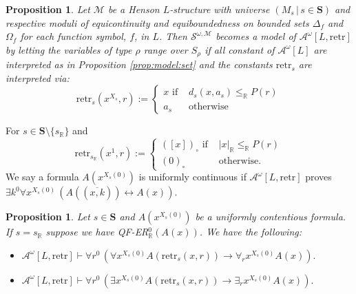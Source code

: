 \documentclass[11pt]{amsart}
\newtheorem{proposition}[theorem]{Proposition}
\theoremstyle{definition}
\theoremstyle{remark}
\def\RR{\mathbb{R}}
\begin{document}
\begin{proposition}
\label{prop:retr:int}
Let $\mathscr{M}$ be a Henson $L$-structure with universe $(M_s\,|\, s \in \mathbf{S})$ and respective moduli of equicontinuity and equiboundedness on
bounded sets $\Delta_f$ and $\Omega_f$ for each function symbol, $f$, in $L$. Then $\mathcal{S}^{\omega,\mathscr{M}}$ becomes a model of $\mathcal{A}^\omega[L,\mathrm{retr}]$ by letting the variables of type $\rho$ range over $S_\rho$ if all constant of $\mathcal{A}^\omega[L]$ are interpreted as in Proposition \ref{prop:model:set} and the constants $\mathrm{retr}_s$ are interpreted via:
\[
\mathrm{retr}_s(x^{X_s},r):=\begin{cases} x \text{ if } &d_s(x,a_s) \le_\RR P(r) \\a_s&\text{otherwise}\end{cases}
\]
\end{proposition}
For $s \in \mathbf{S}\setminus \{s_\RR\}$ and 
\[
\mathrm{retr}_{s_\RR}(x^1,r):=\begin{cases} ([x])_\circ \text{ if } &|x|_\RR \le_\RR P(r) \\(0)_\circ&\text{otherwise.}\end{cases}
\]
We say a formula $A(x^{X_s(0)})$ is uniformly continuous if $\mathcal{A}^\omega[L,\mathrm{retr}]$ proves $\exists k^0\forall x^{X_s(0)}\, (A((\overline{x,k})) \leftrightarrow A(x))$.
\begin{proposition}
\label{prop:retr}
Let  $s \in \mathbf{S}$ and $A(x^{X_s(0)})$ be a uniformly contentious formula. If $s=s_\RR$ suppose we have \textup{\textsf{QF}\mbox{-}\textsf{ER}}$^0_\RR(A(x))$. We have the following:
    \begin{itemize}
         \item $\mathcal{A}^\omega[L,\mathrm{retr}]\vdash \forall r^0\,( \forall x^{X_s(0)}A(\mathrm{retr}_s(x,r)) \to \forall_{r} x^{X_s(0)}A(x)).$
         \item $\mathcal{A}^\omega[L,\mathrm{retr}]\vdash  \forall r^0\,(\exists x^{X_s(0)}A(\mathrm{retr}_s(x,r))\to \exists_{r}x^{X_s(0)}A(x)).$
    \end{itemize}
  
\end{proposition}
\end{document}
